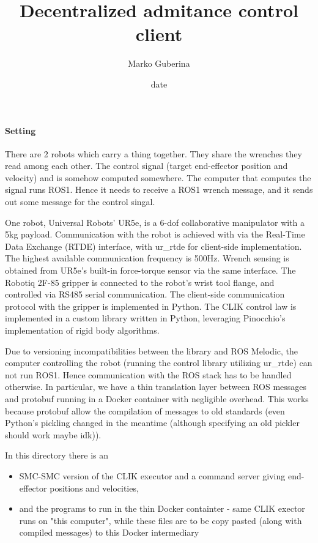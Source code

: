 \documentclass{article}
\title{Decentralized admitance control client}
\date{date}
\author{Marko Guberina}
\begin{document}
\maketitle
\paragraph{Setting} There are 2 robots which carry a thing together.
They share the wrenches they read among each other. The control signal 
(target end-effector position and velocity) and is somehow computed somewhere.
The computer that computes the signal runs ROS1. Hence it needs to receive
a ROS1 wrench message, and it sends out some message for the control singal.

One robot, Universal Robots’ UR5e, is a 6-dof collaborative manipulator with a 5kg payload.
Communication with the robot is achieved with via the Real-Time Data Exchange (RTDE) interface,
with ur\_rtde for client-side implementation. The highest available communication frequency is 500Hz.
Wrench sensing is obtained from UR5e’s built-in force-torque sensor via the same interface.
The Robotiq 2F-85 gripper is connected to the robot’s wrist tool flange, and controlled via RS485 serial communication.
The client-side communication protocol with the gripper is implemented in Python.
The CLIK control law is implemented in a custom library written in Python, leveraging Pinocchio’s
implementation of rigid body algorithms.

Due to versioning incompatibilities between the library and ROS Melodic, the computer controlling
the robot (running the control library utilizing ur\_rtde) can not run ROS1.
Hence communication with the ROS stack has to be handled otherwise.
In particular, we have a thin translation layer
between ROS messages and protobuf running in a Docker container with negligible overhead.
This works because protobuf allow the compilation of messages to old standards 
(even Python's pickling changed in the meantime (although specifying an old pickler should work maybe idk)).

In this directory there is an 
\begin{itemize}
	\item SMC-SMC version of the CLIK executor and a command server
giving end-effector positions and velocities,
\item and the programs to run in the thin Docker containter - same CLIK exector runs on "this computer",
	while these files are to be copy pasted (along with compiled messages) to this Docker intermediary
\end{itemize}
\end{document}
